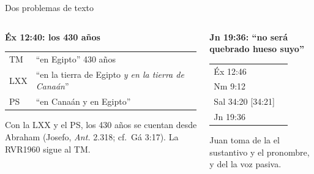 \begin{frame}{Dos problemas de texto}
\begin{columns}[t,onlytextwidth]
\begin{column}{0.48\textwidth}
\textbf{\small\textcolor{tierraroja}{Éx 12:40: los 430 años}}\par\smallskip
\scriptsize\renewcommand{\arraystretch}{1.12}
\begin{tabular}{@{}L{1.3cm}L{4.1cm}@{}}
\toprule
TM & ``en Egipto'' 430 años \\
LXX & ``en la tierra de Egipto \emph{y en la tierra de Canaán}'' \\
PS & ``en Canaán y en Egipto'' \\
\bottomrule
\end{tabular}\par\smallskip
\RaggedRight Con la LXX y el PS, los 430 años se cuentan desde Abraham (Josefo, \emph{Ant.} 2.318; cf.\ Gá 3:17). La RVR1960 sigue al TM.
\end{column}
\begin{column}{0.50\textwidth}
\textbf{\small\textcolor{tierraroja}{Jn 19:36: ``no será quebrado hueso suyo''}}\par\smallskip
\scriptsize\renewcommand{\arraystretch}{1.12}
\begin{tabular}{@{}L{1.7cm}L{4.1cm}@{}}
\toprule
Éx 12:46 &  \\
Nm 9:12 &  \\
Sal 34:20 [34:21] &  \\
Jn 19:36 &  \\
\bottomrule
\end{tabular}\par\smallskip
\RaggedRight Juan toma de la  el sustantivo y el pronombre, y del  la voz pasiva.
\end{column}
\end{columns}
\end{frame}

